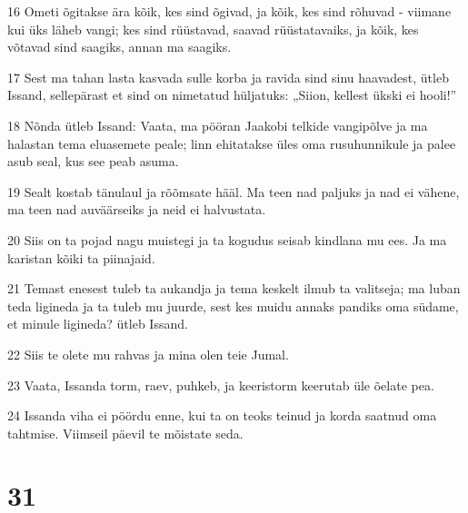 \par 16 Ometi õgitakse ära kõik, kes sind õgivad, ja kõik, kes sind rõhuvad - viimane kui üks läheb vangi; kes sind rüüstavad, saavad rüüstatavaiks, ja kõik, kes võtavad sind saagiks, annan ma saagiks.
\par 17 Sest ma tahan lasta kasvada sulle korba ja ravida sind sinu haavadest, ütleb Issand, sellepärast et sind on nimetatud hüljatuks: „Siion, kellest ükski ei hooli!”
\par 18 Nõnda ütleb Issand: Vaata, ma pööran Jaakobi telkide vangipõlve ja ma halastan tema eluasemete peale; linn ehitatakse üles oma rusuhunnikule ja palee asub seal, kus see peab asuma.
\par 19 Sealt kostab tänulaul ja rõõmsate hääl. Ma teen nad paljuks ja nad ei vähene, ma teen nad auväärseiks ja neid ei halvustata.
\par 20 Siis on ta pojad nagu muistegi ja ta kogudus seisab kindlana mu ees. Ja ma karistan kõiki ta piinajaid.
\par 21 Temast enesest tuleb ta aukandja ja tema keskelt ilmub ta valitseja; ma luban teda ligineda ja ta tuleb mu juurde, sest kes muidu annaks pandiks oma südame, et minule ligineda? ütleb Issand.
\par 22 Siis te olete mu rahvas ja mina olen teie Jumal.
\par 23 Vaata, Issanda torm, raev, puhkeb, ja keeristorm keerutab üle õelate pea.
\par 24 Issanda viha ei pöördu enne, kui ta on teoks teinud ja korda saatnud oma tahtmise. Viimseil päevil te mõistate seda.

\chapter{31}

